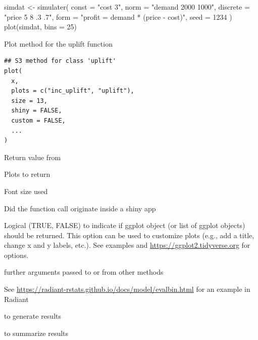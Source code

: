 \documentclass[a4paper]{book}
\begin{document}
%
\begin{Examples}
\begin{ExampleCode}
simdat <- simulater(
  const = "cost 3",
  norm = "demand 2000 1000",
  discrete = "price 5 8 .3 .7",
  form = "profit = demand * (price - cost)",
  seed = 1234
)
plot(simdat, bins = 25)

\end{ExampleCode}
\end{Examples}
%
\begin{Description}
Plot method for the uplift function
\end{Description}
%
\begin{Usage}
\begin{verbatim}
## S3 method for class 'uplift'
plot(
  x,
  plots = c("inc_uplift", "uplift"),
  size = 13,
  shiny = FALSE,
  custom = FALSE,
  ...
)
\end{verbatim}
\end{Usage}
%
\begin{Arguments}
\begin{ldescription}
\item[\code{x}] Return value from 

\item[\code{plots}] Plots to return

\item[\code{size}] Font size used

\item[\code{shiny}] Did the function call originate inside a shiny app

\item[\code{custom}] Logical (TRUE, FALSE) to indicate if ggplot object (or list of ggplot objects) should be returned. This option can be used to customize plots (e.g., add a title, change x and y labels, etc.). See examples and \url{https://ggplot2.tidyverse.org} for options.

\item[\code{...}] further arguments passed to or from other methods
\end{ldescription}
\end{Arguments}
%
\begin{Details}
See \url{https://radiant-rstats.github.io/docs/model/evalbin.html} for an example in Radiant
\end{Details}
%
\begin{SeeAlso}
 to generate results

 to summarize results
\end{SeeAlso}
\end{document}
